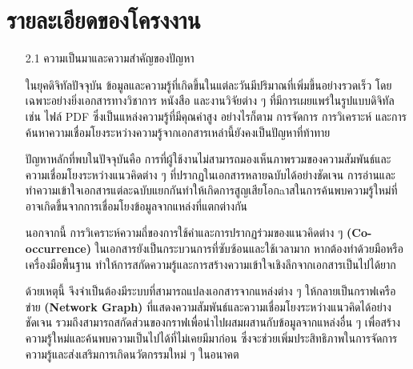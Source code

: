 \documentclass[12pt,a4paper]{article}
\newcommand{\textlight}[1]{{\thailightfont #1}}
\begin{document}
\section{รายละเอียดของโครงงาน}
\begin{enumerate}[leftmargin=2cm]
\small
    \item[2.1] ความเป็นมาและความสำคัญของปัญหา
    \vspace{0.35cm}
    \\
    \textlight{
        \hspace{1cm}ในยุคดิจิทัลปัจจุบัน ข้อมูลและความรู้ที่เกิดขึ้นในแต่ละวันมีปริมาณที่เพิ่มขึ้นอย่างรวดเร็ว โดยเฉพาะอย่างยิ่งเอกสารทางวิชาการ หนังสือ และงานวิจัยต่าง ๆ ที่มีการเผยแพร่ในรูปแบบดิจิทัล เช่น ไฟล์ PDF ซึ่งเป็นแหล่งความรู้ที่มีคุณค่าสูง อย่างไรก็ตาม การจัดการ การวิเคราะห์ และการค้นหาความเชื่อมโยงระหว่างความรู้จากเอกสารเหล่านี้ยังคงเป็นปัญหาที่ท้าทาย

        \hspace{1cm}ปัญหาหลักที่พบในปัจจุบันคือ การที่ผู้ใช้งานไม่สามารถมองเห็นภาพรวมของความสัมพันธ์และความเชื่อมโยงระหว่างแนวคิดต่าง ๆ ที่ปรากฏในเอกสารหลายฉบับได้อย่างชัดเจน การอ่านและทำความเข้าใจเอกสารแต่ละฉบับแยกกันทำให้เกิดการสูญเสียโอกaาสในการค้นพบความรู้ใหม่ที่อาจเกิดขึ้นจากการเชื่อมโยงข้อมูลจากแหล่งที่แตกต่างกัน

        \hspace{1cm}นอกจากนี้ การวิเคราะห์ความถี่ของการใช้คำและการปรากฏร่วมของแนวคิดต่าง ๆ \textbf{(Co-occurrence)} ในเอกสารยังเป็นกระบวนการที่ซับซ้อนและใช้เวลามาก หากต้องทำด้วยมือหรือเครื่องมือพื้นฐาน ทำให้การสกัดความรู้และการสร้างความเข้าใจเชิงลึกจากเอกสารเป็นไปได้ยาก

        \hspace{1cm}ด้วยเหตุนี้ จึงจำเป็นต้องมีระบบที่สามารถแปลงเอกสารจากแหล่งต่าง ๆ ให้กลายเป็นกราฟเครือข่าย \textbf{(Network Graph)} ที่แสดงความสัมพันธ์และความเชื่อมโยงระหว่างแนวคิดได้อย่างชัดเจน รวมถึงสามารถสกัดส่วนของกราฟเพื่อนำไปผสมผสานกับข้อมูลจากแหล่งอื่น ๆ เพื่อสร้างความรู้ใหม่และค้นพบความเป็นไปได้ที่ไม่เคยมีมาก่อน ซึ่งจะช่วยเพิ่มประสิทธิภาพในการจัดการความรู้และส่งเสริมการเกิดนวัตกรรมใหม่ ๆ ในอนาคต
    }


\end{enumerate}
\end{document}
